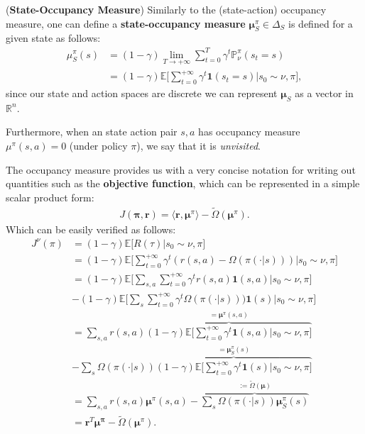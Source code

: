 \begin{definition}
    \label{def:state_occupancy_measure}
    (\textbf{State-Occupancy Measure}) 
    Similarly to the (state-action) occupancy measure, one can define a \textbf{state-occupancy measure} $\bm{\mu}^\pi_S \in \Delta_{S}$ is defined for a given state as follows:
    \begin{align*}
        \mu^\pi_S(s) &= (1-\gamma) \lim_{T \rightarrow + \infty} \sum_{t=0}^T \gamma^t \mathbb{P}_\nu^\pi(s_t=s) \\
        &= (1-\gamma)  \mathbb{E} \Big[ \sum_{t=0}^{+\infty} \gamma^t \mathbf{1}(s_t=s) \Big| s_0 \sim \nu, \pi\Big],
    \end{align*}
    since our state and action spaces are discrete we can represent $\bm{\mu}_S$ as a vector in $\mathbb{R}^{n}$.
\end{definition}
\noindent
Furthermore, when an state action pair $s,a$ has occupancy measure $\mu^\pi(s,a)=0$ (under policy $\pi$), we say that it is \textit{unvisited}. 

\begin{observation}
    \label{obs:mu_pi_objective}
    The occupancy measure provides us with a very concise notation for writing out quantities such as the \textbf{objective function}, which can be represented in a simple scalar product form:
    \begin{align*}
        J(\bm{\pi},\bm{r}) = \langle \bm{r}, \bm{\mu}^\pi \rangle - \tilde{\Omega}(\bm{\mu}^\pi).
    \end{align*}
    Which can be easily verified as follows:
    \begin{align*}
        J^\nu(\pi) &= (1-\gamma)  \mathbb{E}\Big[ R(\tau) \Big| s_0 \sim \nu, \pi \Big] \\
                &=  (1-\gamma) \mathbb{E}\Bigg[ \sum_{t=0}^{+\infty} \gamma^t (r(s,a) - \Omega(\pi(\cdot|s))) \Big| s_0 \sim \nu, \pi \Bigg]\\
                &= (1-\gamma)  \mathbb{E}\Bigg[ \sum_{s,a} \sum_{t=0}^{+\infty} \gamma^t  r(s,a) \textbf{1}(s,a) \Big| s_0 \sim \nu, \pi \Bigg] \\& -  (1-\gamma)  \mathbb{E}\Bigg[ \sum_{s} \sum_{t=0}^{+\infty} \gamma^t \Omega(\pi(\cdot|s))) \textbf{1}(s) \Big| s_0 \sim \nu, \pi \Bigg]   \\
                &= \sum_{s,a} r(s,a)\overbrace{ (1-\gamma) \mathbb{E}\Bigg[  \sum_{t=0}^{+\infty}\gamma^t  \textbf{1}(s,a) \Big| s_0 \sim \nu, \pi \Bigg]}^{=\bm{\mu}^\pi(s,a)}\\
                &- \sum_{s} \Omega(\pi(\cdot|s)) \overbrace{ (1-\gamma) \mathbb{E}\Bigg[  \sum_{t=0}^{+\infty} \gamma^t \textbf{1}(s) \Big| s_0 \sim \nu, \pi \Bigg]}^{=\bm{\mu}_S^\pi(s)}\\
                &= \sum_{s,a} r(s,a) \bm{\mu}^\pi(s,a) - \overbrace{\sum_{s} \Omega(\pi(\cdot|s)) \bm{\mu}_S^\pi(s) }^{:=\tilde{\Omega}(\bm{\mu})}\\
                &=  \bm{r}^T \bm{\bm{\mu}^\pi} - \tilde{\Omega}(\bm{\bm{\mu}}^\pi).
    \end{align*}
\end{observation}


